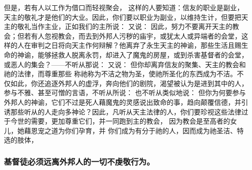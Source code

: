 但是，若有人以工作为借口而轻视聚会， 这样的人要知道：信友的职业是副业，天主的敬礼才是他们的大业。因此，你们要以职业为副业，以维持生计，但要把天主的敬礼当作主业，正如我们的主所说： 又说： 因此，努力不要离开天主的教会；但若有人忽视教会，而去到外邦人污秽的庙宇，或犹太人或异端者的会堂，这样的人在审判之日将向天主作何辩解？他离弃了永生天主的神谕，那些生活且赐生命的神谕，能够拯救人脱离永罚，却进入了魔鬼的房屋，或到杀害基督者的会堂，或恶人的集会？——不听从那说： 又说： 但你却离弃信友的聚集、天主的教会和祂的法律，而尊重那些 称祂称为不洁之物为圣，使祂所圣化的东西成为不洁。不仅如此，你还追逐外邦人的虚浮，奔向他们的剧院，渴望被认为是进到其中的人，参与不雅、甚至可憎的言语，不听从所说： 也不听从类似地说： 但你为何要参与外邦人的神谕，它们不过是死人藉魔鬼的灵感说出致命的事，趋向颠覆信德，并引诱那些听从的人走向多神论？因此，凡听从天主法律的人，你们要珍视这些法律过于今世的需要，更加尊重它们，并一同跑到主的教会， 因为教会是至高者的女儿，她藉恩宠之道为你们孕育，并 你们成为有分于祂的人，因而成为祂圣洁、特选的肢体，\par


\subsubsection{基督徒必须远离外邦人的一切不虔敬行为。}

